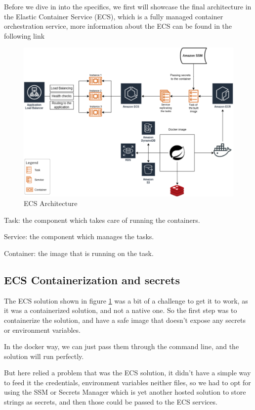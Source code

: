 Before we dive in into the specifics, we first will showcase the final architecture in the
Elastic Container Service (ECS), which is a fully managed container orchestration service,
more information about the ECS can be found in the following link \cite{ecs_intro}

\begin{figure}[!ht]
    \centering
    \includegraphics[width=\textwidth]{images/ECS}
    \caption{\footnotesize{ECS Architecture}}
    \label{fig:ECSArch}
\end{figure}

Task: the component which takes care of running the containers.

Service: the component which manages the tasks.

Container: the image that is running on the task.

\subsection {ECS Containerization and secrets}

The ECS solution shown in figure \ref{fig:ECSArch} was a bit of a challenge to get it to
work, as it was a containerized solution, and not a native one.
So the first step was to containerize the solution, and have a safe image that doesn't
expose any secrets or environment variables.

In the docker way, we can just pass them through the command line,
and the solution will run perfectly.

But here relied a problem that was the ECS solution, it didn't have a simple
way to feed it the credentials, environment variables neither files, so we had to opt
for using the SSM or Secrets Manager
which is yet another hosted solution to store strings as secrets, and then those could be 
passed to the ECS services.

